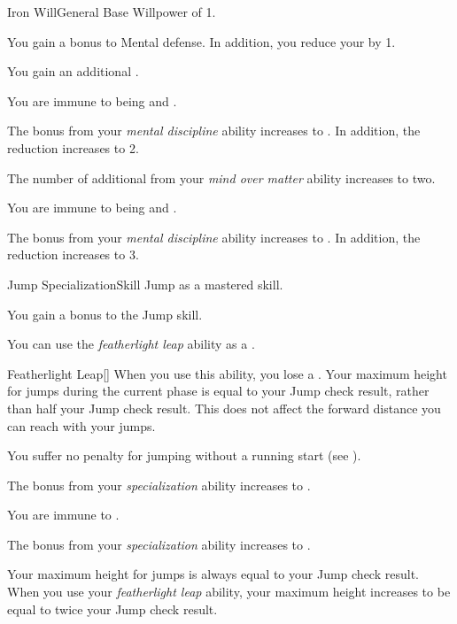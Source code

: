     \begin{feat}{Iron Will}{General}
        \featpre Base Willpower of 1.

         You gain a  bonus to Mental defense.
        In addition, you reduce your  by 1.

         You gain an additional .

         You are immune to being  and .

         The bonus from your \textit{mental discipline} ability increases to .
        In addition, the  reduction increases to 2.

         The number of additional  from your \textit{mind over matter} ability increases to two.

         You are immune to being  and .

         The bonus from your \textit{mental discipline} ability increases to .
        In addition, the  reduction increases to 3.
    \end{feat}

    \begin{feat}{Jump Specialization}{Skill}
        \featpre Jump as a mastered skill.

         You gain a  bonus to the Jump skill.

         You can use the \textit{featherlight leap} ability as a .
        \begin{freeability}{Featherlight Leap}[]
            When you use this ability, you lose a .
            Your maximum height for jumps during the current phase is equal to your Jump check result, rather than half your Jump check result.
            This does not affect the forward distance you can reach with your jumps.
        \end{freeability}

         You suffer no penalty for jumping without a running start (see ).

         The bonus from your \textit{specialization} ability increases to .

         You are immune to .

         The bonus from your \textit{specialization} ability increases to .

         Your maximum height for jumps is always equal to your Jump check result.
        When you use your \textit{featherlight leap} ability, your maximum height increases to be equal to twice your Jump check result.
    \end{feat}

